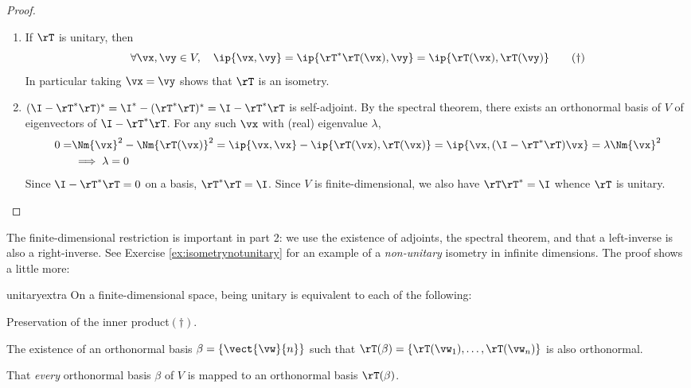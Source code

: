 \begin{proof}
\begin{enumerate}
  \item If $\rT$ is unitary, then
	\[\forall\vx,\vy\in V,\quad\ip{\vx,\vy}=\ip{\rT^*\rT(\vx),\vy}=\ip{\rT(\vx),\rT(\vy)}\tag{$\dag$}\]
	In particular taking $\vx=\vy$ shows that $\rT$ is an isometry.
	\item $(\I-\rT^*\rT)^*=\I^*-(\rT^*\rT)^*=\I-\rT^*\rT$ is self-adjoint. By the spectral theorem, there exists an orthonormal basis of $V$ of eigenvectors of $\I-\rT^*\rT$. For any such $\vx$ with (real) eigenvalue $\lambda$,
	\begin{align*}
		0=&\Nm{\vx}^2-\Nm{\rT(\vx)}^2=\ip{\vx,\vx}-\ip{\rT(\vx),\rT(\vx)}=\ip{\vx,(\I-\rT^*\rT)\vx}=\lambda\Nm{\vx}^2\\
		&\implies\lambda=0
	\end{align*}
	Since $\I-\rT^*\rT=0$ on a basis, $\rT^*\rT=\I$. Since $V$ is finite-dimensional, we also have $\rT\rT^*=\I$ whence $\rT$ is unitary.\qedhere
\end{enumerate} 
\end{proof}

The finite-dimensional restriction is important in part 2: we use the existence of adjoints, the spectral theorem, and that a left-inverse is also a right-inverse. See Exercise \ref{ex:isometrynotunitary} for an example of a \emph{non-unitary} isometry in infinite dimensions.\smallbreak
The proof shows a little more:

\begin{cor}{}{unitaryextra}
On a finite-dimensional space, being unitary is equivalent to each of the following:
\begin{enumeratea}\itemsep0pt
	\item Preservation of the inner product\footnotemark $(\dag)$. 
 	\item The existence of an orthonormal basis $\beta=\{\vect{\vw}{n}\}$ such that $\rT(\beta)=\{\rT(\vw_1),\ldots,\rT(\vw_n)\}$ is also orthonormal.
 	\item That \emph{every} orthonormal basis $\beta$ of $V$ is mapped to an orthonormal basis $\rT(\beta)$.
\end{enumeratea} 
\end{cor}


